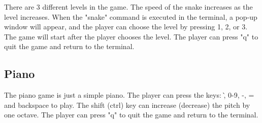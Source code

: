 \documentclass[
	a4paper, %
	11pt, %
]{CSUniSchoolLabReport}
\begin{document}
There are 3 different levels in the game. The speed of the snake increases as the level increases. When the "snake" command is executed in the terminal, a pop-up window will appear, and the player can choose the level by pressing 1, 2, or 3. The game will start after the player chooses the level. The player can press "q" to quit the game and return to the terminal.
\subsection{Piano}
The piano game is just a simple piano. The player can press the keys: \`, 0-9, -, = and backspace to play. The shift (ctrl) key can increase (decrease) the pitch by one octave. The player can press "q" to quit the game and return to the terminal.
\end{document}
